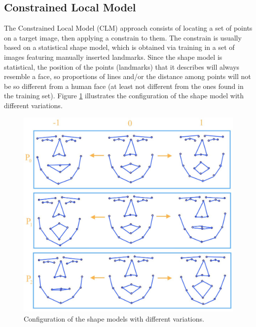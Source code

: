 \subsection{Constrained Local Model}

The Constrained Local Model (CLM) approach consists of locating a set of points on a target image, then applying a constrain to them. The constrain is usually based on a statistical shape model, which is obtained via training in a set of images featuring manually inserted landmarks. Since the shape model is statistical, the position of the points (landmarks) that it describes will always resemble a face, so proportions of lines and/or the distance among points will not be so different from a human face (at least not different from the ones found in the training set). Figure \ref{fig:clm-model-variation} illustrates the configuration of the shape model with different variations.

\begin{figure}[ht]
    \centering
    \includegraphics[width=0.6\linewidth]{figures/clm-model-variation.jpg}
    \caption{Configuration of the shape models with different variations\parencite{yu2010facial}.}
    \label{fig:clm-model-variation}
\end{figure}

